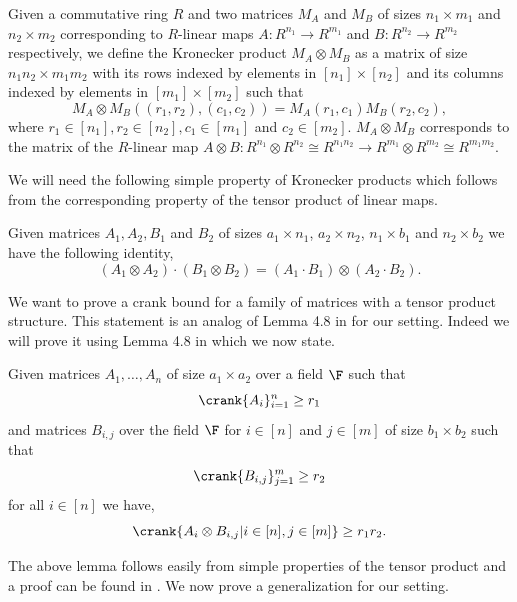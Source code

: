 \begin{define}
Given a commutative ring $R$ and two matrices $M_A$ and $M_B$ of sizes $n_1\times m_1$ and $n_2\times m_2$ corresponding to $R$-linear maps $A:R^{n_1}\rightarrow R^{m_1}$ and $B:R^{n_2}\rightarrow R^{m_2}$ respectively, we define the Kronecker product $M_A\otimes M_B$ as a matrix of size $n_1n_2\times m_1m_2$ with its rows indexed by elements in $[n_1]\times [n_2]$ and its columns indexed by elements in $[m_1]\times [m_2]$ such that
$$M_A\otimes M_B ((r_1,r_2),(c_1,c_2))=M_A(r_1,c_1)M_B(r_2,c_2),$$
where $r_1\in [n_1],r_2\in [n_2],c_1\in [m_1]$ and $c_2\in [m_2]$. $M_A\otimes M_B$ corresponds to the matrix of the $R$-linear map $A\otimes B: R^{n_1}\otimes R^{n_2}\cong R^{n_1n_2}\rightarrow R^{m_1}\otimes R^{m_2}\cong R^{m_1m_2}$.
\end{define}

We will need the following simple property of Kronecker products which follows from the corresponding property of the tensor product of linear maps.

\begin{lem}\label{fact:multOfKronecker}
Given matrices $A_1,A_2,B_1$ and $B_2$ of sizes $a_1\times n_1$, $a_2\times n_2$, $n_1\times b_1$ and $n_2\times b_2$ we have the following identity,
$$(A_1 \otimes A_2) \cdot (B_1\otimes B_2)=(A_1\cdot B_1)\otimes (A_2\cdot B_2).$$
\end{lem}


We want to prove a crank bound for a family of matrices with a tensor product structure. This statement is an analog of Lemma 4.8 in \cite{dhar2021proof} for our setting. Indeed we will prove it using Lemma 4.8 in \cite{dhar2021proof} which we now state.

\begin{lem}\label{lem:crankTensor}
Given matrices $A_1,\hdots,A_n$ of size $a_1\times a_2$ over a field $\F$ such that 
{\em $$\crank\{A_i\}_{i=1}^n\ge r_1$$} 
and matrices $B_{i,j}$ over the field $\F$ for $i\in [n]$ and $j\in [m]$ of size $b_1\times b_2$ such that 
{\em $$\crank\{B_{i,j}\}_{j=1}^m\ge r_2$$}
for all $i\in [n]$ we have,
\em{$$\crank\{A_i\otimes B_{i,j}|i\in [n],j\in[m]\}\ge r_1r_2.$$}
\end{lem}

The above lemma follows easily from simple properties of the tensor product and a proof can be found in \cite{dhar2021proof}. We now prove a generalization for our setting. 

